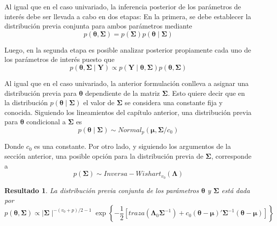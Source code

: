 \documentclass[
  10pt,
  spanish,
]{book}
\newtheorem{proposition}{Resultado}[chapter]
\theoremstyle{definition}
\theoremstyle{definition}
\theoremstyle{definition}
\theoremstyle{definition}
\theoremstyle{remark}
\begin{document}
Al igual que en el caso univariado, la inferencia posterior de los parámetros de interés debe ser llevada a cabo en dos etapas: En la primera, se debe establecer la distribución previa conjunta para ambos parámetros mediante
\begin{equation*}
p(\boldsymbol \theta,\boldsymbol \Sigma)=p(\boldsymbol \Sigma)p(\boldsymbol \theta\mid \boldsymbol \Sigma)
\end{equation*}

Luego, en la segunda etapa es posible analizar posterior propiamente cada uno de los parámetros de interés puesto que
\begin{equation*}
p(\boldsymbol \theta,\boldsymbol \Sigma\mid \mathbf{Y})\propto p(\mathbf{Y} \mid \boldsymbol \theta,\boldsymbol \Sigma)p(\boldsymbol \theta,\boldsymbol \Sigma)
\end{equation*}

Al igual que en el caso univariado, la anterior formulación conlleva a asignar una distribución previa para \(\boldsymbol \theta\) dependiente de la matriz \(\boldsymbol \Sigma\). Esto quiere decir que en la distribución \(p(\boldsymbol \theta\mid \boldsymbol \Sigma)\) el valor de \(\boldsymbol \Sigma\) se considera una constante fija y conocida. Siguiendo los lineamientos del capítulo anterior, una distribución previa para \(\boldsymbol \theta\) condicional a \(\boldsymbol \Sigma\) es
\begin{equation*}
p(\boldsymbol \theta\mid \boldsymbol \Sigma)\sim Normal_p(\boldsymbol \mu,\boldsymbol \Sigma/c_0)
\end{equation*}

Donde \(c_0\) es una constante. Por otro lado, y siguiendo los argumentos de la sección anterior, una posible opción para la distribución previa de \(\boldsymbol \Sigma\), corresponde a
\begin{equation*}
p(\boldsymbol \Sigma)\sim Inversa-Wishart_{v_0}(\boldsymbol \Lambda)
\end{equation*}

\begin{proposition}
\protect\hypertarget{prp:unnamed-chunk-43}{}{\label{prp:unnamed-chunk-43} }La distribución previa conjunta de los parámetros \(\boldsymbol \theta\) y \(\boldsymbol \Sigma\) está dada por
\begin{equation*}
p(\boldsymbol \theta,\boldsymbol \Sigma) \propto \mid \boldsymbol \Sigma\mid ^{-(v_0+p)/2-1}
\exp\left\{ -\frac{1}{2}\left[traza(\boldsymbol \Lambda_0\boldsymbol \Sigma^{-1})+
c_0(\boldsymbol \theta-\boldsymbol \mu)'\boldsymbol \Sigma^{-1}(\boldsymbol \theta-\boldsymbol \mu)\right]\right\}
\end{equation*}
\end{proposition}
\end{document}
